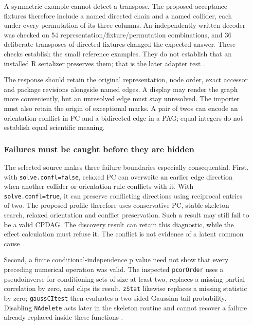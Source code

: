 A symmetric example cannot detect a transpose. The proposed acceptance
fixtures therefore include a named directed chain and a named collider,
each under every permutation of its three columns. An independently
written decoder was checked on 54 representation/fixture/permutation
combinations, and 36 deliberate transposes of directed fixtures changed
the expected answer. These checks establish the small reference
examples. They do not establish that an installed R serializer preserves
them; that is the later adapter test
\citep{exec13_pcalg_reuse_examples}.

The response should retain the original representation, node order,
exact accessor and package revisions alongside named edges. A display
may render the graph more conveniently, but an unresolved edge must stay
unresolved. The importer must also retain the origin of exceptional
marks. A pair of twos can encode an orientation conflict in PC and a
bidirected edge in a PAG; equal integers do not establish equal
scientific meaning.

\hypertarget{failures-must-be-caught-before-they-are-hidden}{%
\subsubsection{Failures must be caught before they are
hidden}\label{failures-must-be-caught-before-they-are-hidden}}

The selected source makes three failure boundaries especially
consequential. First, with \texttt{solve.confl=false}, relaxed PC can
overwrite an earlier edge direction when another collider or orientation
rule conflicts with it. With \texttt{solve.confl=true}, it can preserve
conflicting directions using reciprocal entries of two. The proposed
profile therefore uses conservative PC, stable skeleton search, relaxed
orientation and conflict preservation. Such a result may still fail to
be a valid CPDAG. The discovery result can retain this diagnostic, while
the effect calculation must refuse it. The conflict is not evidence of a
latent common cause \citep{exec13_pcalg_reuse_primary}.

Second, a finite conditional-independence p value need not show that
every preceding numerical operation was valid. The inspected
\texttt{pcorOrder} uses a pseudoinverse for conditioning sets of size at
least two, replaces a missing partial correlation by zero, and clips its
result. \texttt{zStat} likewise replaces a missing statistic by zero;
\texttt{gaussCItest} then evaluates a two-sided Gaussian tail
probability. Disabling \texttt{NAdelete} acts later in the skeleton
routine and cannot recover a failure already replaced inside these
functions \citep{exec13_pcalg_reuse_primary}.

